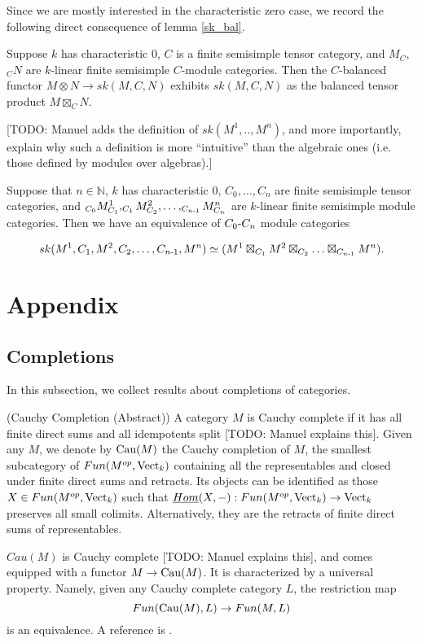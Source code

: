 Since we are mostly interested in the characteristic zero case, we record the
following direct consequence of lemma \ref{sk_bal}.

\begin{theorem}
   Suppose $k$ has characteristic $0$, $C$ is a finite semisimple tensor
   category, and $M_C$,$_{C}N$ are $k$-linear finite semisimple $C$-module
   categories. Then the $C$-balanced functor $M\otimes N\to sk(M,C,N)$
   exhibits $sk(M,C,N)$ as the balanced tensor product $M\boxtimes_C
   N$.
\end{theorem}

[TODO: Manuel adds the definition of $sk(M^{1},..,M^{n})$, and more
importantly, explain why such a definition is more ``intuitive'' than the
algebraic ones (i.e. those defined by modules over algebras).]

\begin{corollary}
  Suppose that $n \in \mathbb{N}$, $k$ has characteristic $0$, $C_{0}, \ldots,
  C_{n}$ are finite semisimple tensor categories, and $_{C_{0}}M^{1}_{C_{1}},
  _{C_{1}}M^{2}_{C_{2}}, \ldots, _{C_{n{\text -}1}}M^{n}_{C_{n}}$ are
  $k$-linear finite semisimple module categories. Then we have an equivalence
  of $C_{0}{\text -}C_{n}$ module categories

  \[
    sk(M^{1}, C_{1}, M^{2}, C_{2}, \ldots, C_{n{\text -} 1}, M^{n})
    \simeq
    (M^{1} \boxtimes_{C_{1}} M^{2} \boxtimes_{C_{2}} \ldots \boxtimes_{C_{n{\text -}1}} M^{n}).
  \]
\end{corollary}

\appendix
\section{Appendix}
   
\subsection{Completions}

\noindent In this subsection, we collect results about completions of categories.

\begin{definition} \label{definition/cauchy-completion/abstract} (Cauchy Completion (Abstract))
  A category $M$ is Cauchy complete if it has all finite direct sums and all
  idempotents split [TODO: Manuel explains this]. Given any $M$, we denote by $\operatorname{Cau}(M)$ the Cauchy
  completion of $M$, the smallest subcategory of $Fun(M^{op},\operatorname{Vect}_k)$
  containing all the representables and closed under finite direct sums and
  retracts. Its objects can be identified as those $X\in Fun(M^{op},\operatorname{Vect}_k)$
  such that $\underline{Hom}(X,-):Fun(M^{op},\operatorname{Vect}_k)\to\operatorname{Vect}_k$ preserves all
  small colimits. Alternatively, they are the retracts of finite direct sums
  of representables.

  $Cau(M)$ is Cauchy complete [TODO: Manuel explains this], and comes equipped with a functor
  $M\to \operatorname{Cau}(M)$. It is characterized by a universal property. Namely, given
  any Cauchy complete category $L$, the restriction
  map $$Fun(\operatorname{Cau}(M),L)\to Fun(M,L)$$ is an equivalence. A reference is
  \cite[Sections 5.5 and 5.7]{kelly/basic-concepts-enriched}.
\end{definition}

